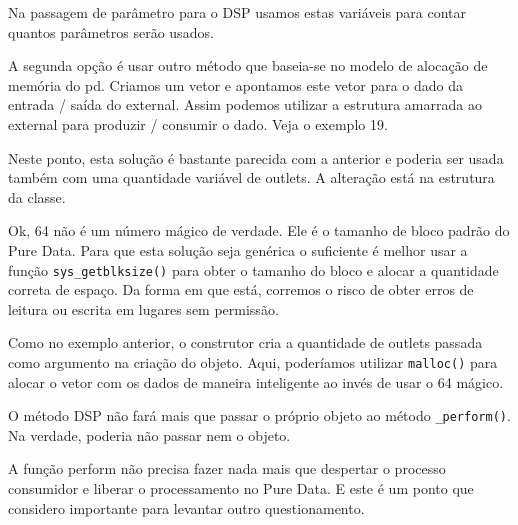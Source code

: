 

Na passagem de parâmetro para o DSP usamos estas variáveis para contar quantos
parâmetros serão usados.



A segunda opção é usar outro método que baseia-se no modelo de alocação de
memória do pd. Criamos um vetor e apontamos este vetor para o dado da entrada
/ saída do external. Assim podemos utilizar a estrutura amarrada ao external
para produzir / consumir o dado. Veja o exemplo 19.



Neste ponto, esta solução é bastante parecida com a anterior e poderia ser usada também com uma quantidade
variável de outlets. A alteração está na estrutura da classe.



Ok, 64 não é um número mágico de verdade. Ele é o tamanho de bloco padrão do
Pure Data. Para que esta solução seja genérica o suficiente é melhor usar a
função \texttt{sys\_getblksize()} para obter o tamanho do bloco e alocar
a quantidade correta de espaço. Da forma em que está, corremos o risco de
obter erros de leitura ou escrita em lugares sem permissão. 



Como no exemplo anterior, o construtor cria a quantidade de outlets passada
como argumento na criação do objeto. Aqui, poderíamos utilizar
\texttt{malloc()} para alocar o vetor com os dados de maneira inteligente ao
invés de usar o 64 mágico.



O método DSP não fará mais que passar o próprio objeto ao método
\texttt{\_perform()}. Na verdade, poderia não passar nem o objeto.



A função perform não precisa fazer nada mais que despertar o processo
consumidor e liberar o processamento no Pure Data. E este é um ponto que
considero importante para levantar outro questionamento.

